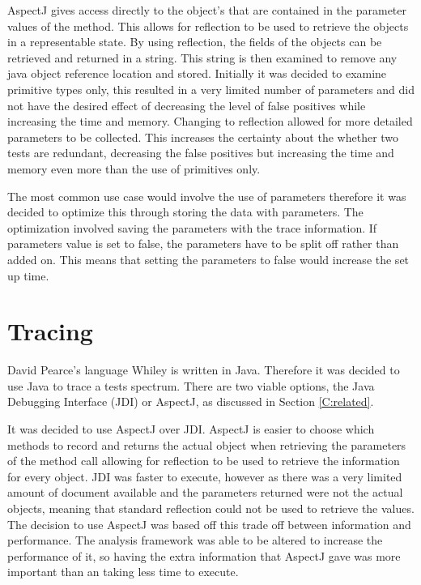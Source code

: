 AspectJ gives access directly to the object's that are contained in the parameter values of the method. This allows for reflection to be used to retrieve the objects in a representable state. By using reflection, the fields of the objects can be retrieved and returned in a string. This string is then examined to remove any java object reference location and stored. Initially it was decided to examine primitive types only, this resulted in a very limited number of parameters and did not have the desired effect of decreasing the level of false positives while increasing the time and memory. Changing to reflection allowed for more detailed parameters to be collected. This increases the certainty about the whether two tests are redundant, decreasing the false positives but increasing the time and memory even more than the use of primitives only. 

The most common use case would involve the use of parameters therefore it was decided to optimize this through storing the data with parameters. The optimization involved saving the parameters with the trace information. If parameters value is set to false, the parameters have to be split off rather than added on. This means that setting the parameters to false would increase the set up time.

\section{Tracing}
\label{S:trace}
David Pearce's language Whiley is written in Java. Therefore it was decided to use Java to trace a tests spectrum. There are two viable options, the Java Debugging Interface (JDI) or AspectJ, as discussed in Section \ref{C:related}. 

It was decided to use AspectJ over JDI. AspectJ is easier to choose which methods to record and returns the actual object when retrieving the parameters of the method call allowing for reflection to be used to retrieve the information for every object. JDI was faster to execute, however as there was a very limited amount of document available and the parameters returned were not the actual objects, meaning that standard reflection could not be used to retrieve the values. The decision to use AspectJ was based off this trade off between information and performance. The analysis framework was able to be altered to increase the performance of it, so having the extra information that AspectJ gave was more important than an taking less time to execute. 

